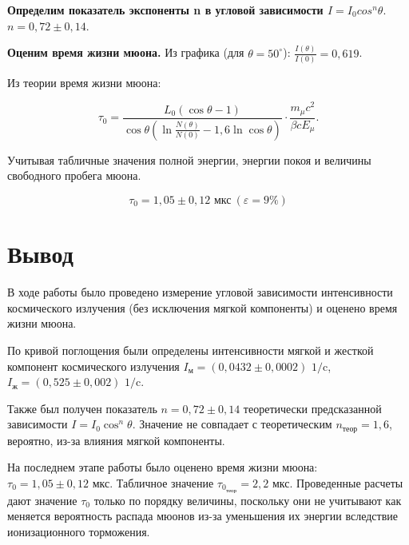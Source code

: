 \documentclass[a4paper,12pt]{article} %
\begin{document}
\noindent \textbf{Определим показатель экспоненты n в угловой зависимости $I = I_0 cos^n \theta$}. $n = 0,72 \pm 0,14.$

\medskip

\noindent \textbf{Оценим время жизни мюона.} Из графика (для $\theta = 50^{\circ}$): $\frac{I(\theta)}{I(0)} = 0,619 $.

\medskip

\noindent Из теории время жизни мюона:

$$\tau_0 = \dfrac{L_0 (\cos\theta - 1)}{\cos\theta (\ln\frac{N(\theta)}{N(0)} - 1,6\ln\cos \theta)} \cdot \dfrac {m_\mu c^2}	{\beta c E_\mu}.$$
	
\noindent Учитывая табличные значения полной энергии, энергии покоя и величины свободного пробега мюона. 

$$\tau_0 = 1,05 \pm 0,12 \text{ мкс}\ ( \varepsilon = 9\% )$$

\section{Вывод}

\noindent В ходе работы было проведено измерение угловой зависимости интенсивности космического излучения (без исключения мягкой компоненты) и оценено время жизни мюона.

\medskip

\noindent По кривой поглощения были определены интенсивности мягкой и жесткой компонент космического излучения $I_{\text{м}} = (0,0432 \pm 0,0002) \text{ 1/c}$, $I_{\text{ж}} = (0,525 \pm 0,002) \text{ 1/c}$.

\medskip

\noindent Также был получен показатель $n = 0,72 \pm 0,14$ теоретически предсказанной зависимости $I = I_0 \cos^n\theta$. Значение не совпадает с теоретическим $n_{\text{теор}} = 1,6$, вероятно, из-за влияния мягкой компоненты. 

\medskip
	
\noindent На последнем этапе работы было оценено время жизни мюона: $\tau_0 = 1,05 \pm 0,12 \text{ мкс}$. Табличное значение $\tau_{0_{\text{теор}}} = 2,2 \text{ мкс}.$ Проведенные расчеты дают значение $\tau_0$ только по порядку величины, поскольку они не учитывают как меняется вероятность распада мюонов из-за уменьшения их энергии вследствие ионизационного торможения.
\end{document}
